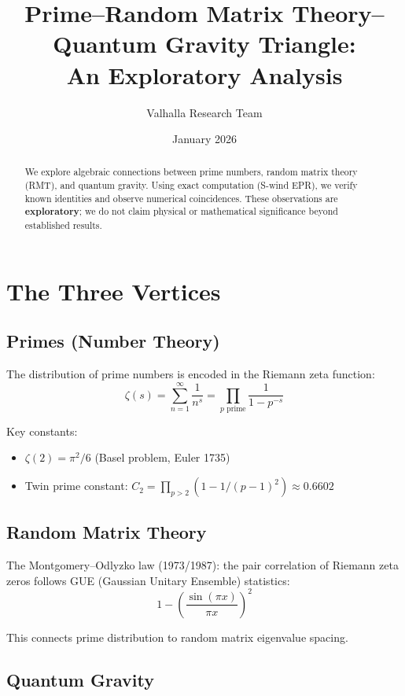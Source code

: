 \documentclass[11pt,a4paper]{article}
\title{Prime--Random Matrix Theory--Quantum Gravity Triangle:\\An Exploratory Analysis}
\author{Valhalla Research Team}
\date{January 2026}
\begin{document}
\maketitle

\begin{abstract}
We explore algebraic connections between prime numbers, random matrix theory (RMT), and quantum gravity. Using exact computation (S-wind EPR), we verify known identities and observe numerical coincidences. These observations are \textbf{exploratory}; we do not claim physical or mathematical significance beyond established results.
\end{abstract}

\section{The Three Vertices}

\subsection{Primes (Number Theory)}

The distribution of prime numbers is encoded in the Riemann zeta function:
\begin{equation}
\zeta(s) = \sum_{n=1}^{\infty} \frac{1}{n^s} = \prod_{p \text{ prime}} \frac{1}{1-p^{-s}}
\end{equation}

Key constants:
\begin{itemize}
    \item $\zeta(2) = \pi^2/6$ (Basel problem, Euler 1735)
    \item Twin prime constant: $C_2 = \prod_{p>2}(1-1/(p-1)^2) \approx 0.6602$
\end{itemize}

\subsection{Random Matrix Theory}

The Montgomery--Odlyzko law (1973/1987): the pair correlation of Riemann zeta zeros follows GUE (Gaussian Unitary Ensemble) statistics:
\begin{equation}
1 - \left(\frac{\sin(\pi x)}{\pi x}\right)^2
\end{equation}

This connects prime distribution to random matrix eigenvalue spacing.

\subsection{Quantum Gravity}
\end{document}
